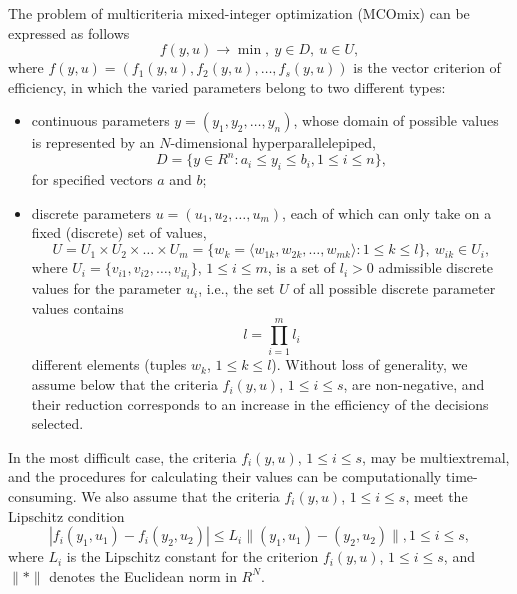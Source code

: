 \documentclass{svproc}
\begin{document}
The problem of multicriteria mixed-integer optimization (MCOmix) can be expressed as follows
\begin{equation}\label{eq:1}
f(y,u)\to \min,\ y\in D,\ u \in U,
\end{equation}
where $f(y,u)=(f_1 (y,u),f_2 (y,u), \dots,f_s (y,u))$ is the vector criterion of efficiency, in which the varied parameters belong to two different types:
\begin{itemize}
	\item continuous parameters $y=(y_1,y_2,\dots,y_n)$, whose domain of possible values is represented by an $N$-dimensional hyperparallelepiped,
\begin{equation}\label{eq:2}
D=\{ y\in R^n: a_i \leq y_i \leq b_i, 1 \leq i \leq n \},
\end{equation}
for specified vectors $a$ and $b$;

	\item discrete parameters  $u=(u_1,u_2, \dots ,u_m)$, each of which can only take on a fixed (discrete) set of values,
\begin{equation}\label{eq:3}
U=U_1 \times U_2 \times \dots \times U_m=\{w_k=\langle w_{1k},w_{2k}, \dots, w_{mk}\rangle : 1 \leq k \leq l\},\ w_{ik} \in U_i,
\end{equation}
where $U_i=\{v_{i1},v_{i2}, \dots ,v_{il_i} \}$, $1 \leq i \leq m$, is a set of $l_i>0$ admissible discrete values for the parameter $u_i$, i.e., the set $U$ of all possible discrete parameter values contains
\begin{equation}\label{eq:4}
  l=\prod\limits^m_{i = 1}{l_i}
\end{equation}
different elements (tuples $w_k$, $1 \leq k \leq l$). Without loss of generality, we assume below that the criteria $f_i(y,u)$, $1 \leq i \leq s$, are non-negative, and their reduction corresponds to an increase in the efficiency of the decisions selected.
\end{itemize}

In the most difficult case, the criteria $f_i(y,u)$, $1 \leq i \leq s$, may be multiextremal, and the procedures for calculating their values can be computationally time-consuming.  We also assume that the criteria $f_i (y,u)$, $1 \leq i \leq s$, meet the Lipschitz condition
\begin{equation}\label{eq:5}
  |f_i (y_1,u_1 )-f_i (y_2, u_2 )| \leq L_i \|(y_1, u_1)-(y_2, u_2)\|, 1 \leq i \leq s,
\end{equation}
where $L_i$ is the Lipschitz constant for the criterion $f_i (y,u)$, $1 \leq i \leq s$,  and $\|*\|$ denotes the Euclidean norm in $R^N$.
\end{document}
